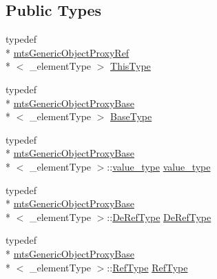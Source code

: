 \subsection*{Public Types}
\begin{DoxyCompactItemize}
\item 
typedef \\*
\hyperlink{classmts_generic_object_proxy_ref}{mts\-Generic\-Object\-Proxy\-Ref}\\*
$<$ \-\_\-element\-Type $>$ \hyperlink{classmts_generic_object_proxy_ref_a02e3c6255922d05f1fc627ee67dd3bd9}{This\-Type}
\item 
typedef \\*
\hyperlink{classmts_generic_object_proxy_base}{mts\-Generic\-Object\-Proxy\-Base}\\*
$<$ \-\_\-element\-Type $>$ \hyperlink{classmts_generic_object_proxy_ref_a52a477c15ddc935700cf9fdbe9da0dcf}{Base\-Type}
\item 
typedef \\*
\hyperlink{classmts_generic_object_proxy_base}{mts\-Generic\-Object\-Proxy\-Base}\\*
$<$ \-\_\-element\-Type $>$\-::\hyperlink{classmts_generic_object_proxy_ref_af50eac4bbf86d9609d7cd77c33d4bf54}{value\-\_\-type} \hyperlink{classmts_generic_object_proxy_ref_af50eac4bbf86d9609d7cd77c33d4bf54}{value\-\_\-type}
\item 
typedef \\*
\hyperlink{classmts_generic_object_proxy_base}{mts\-Generic\-Object\-Proxy\-Base}\\*
$<$ \-\_\-element\-Type $>$\-::\hyperlink{classmts_generic_object_proxy_base_ac87827bf98fee558160a8985c41f4126}{De\-Ref\-Type} \hyperlink{classmts_generic_object_proxy_ref_af6b06c46f460ed5aca8fbe05ab6bde61}{De\-Ref\-Type}
\item 
typedef \\*
\hyperlink{classmts_generic_object_proxy_base}{mts\-Generic\-Object\-Proxy\-Base}\\*
$<$ \-\_\-element\-Type $>$\-::\hyperlink{classmts_generic_object_proxy_base_adddd01c8aea004bf5f0a5894438970c9}{Ref\-Type} \hyperlink{classmts_generic_object_proxy_ref_a2b4ed89cb2db6ed1dd47d1352ada6be8}{Ref\-Type}
\end{DoxyCompactItemize}
